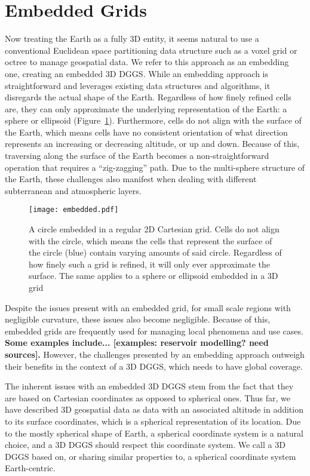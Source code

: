 \section{Embedded Grids} \label{chap:3:embedded}
Now treating the Earth as a fully 3D entity, it seems natural to use a conventional Euclidean space partitioning data structure such as a voxel grid or octree to manage geospatial data.
We refer to this approach as an embedding one, creating an embedded 3D DGGS.
While an embedding approach is straightforward and leverages existing data structures and algorithms, it disregards the actual shape of the Earth.
Regardless of how finely refined cells are, they can only approximate the underlying representation of the Earth: a sphere or ellipsoid (Figure~\ref{fig:embedded}).
Furthermore, cells do not align with the surface of the Earth, which means cells have no consistent orientation of what direction represents an increasing or decreasing altitude, or up and down.
Because of this, traversing along the surface of the Earth becomes a non-straightforward operation that requires a ``zig-zagging'' path.
Due to the multi-sphere structure of the Earth, these challenges also manifest when dealing with different subterranean and atmospheric layers.


\begin{figure}[h]
	\centering
	\texttt{[image: embedded.pdf]}
	\caption[A Circle Embedded in a Regular Cartesian Grid]{
		A circle embedded in a regular 2D Cartesian grid.
		Cells do not align with the circle, which means the cells that represent the surface of the circle (blue) contain varying amounts of said circle.
		Regardless of how finely such a grid is refined, it will only ever approximate the surface.
		The same applies to a sphere or ellipsoid embedded in a 3D grid
	}
	\label{fig:embedded}
\end{figure}


Despite the issues present with an embedded grid, for small scale regions with negligible curvature, these issues also become negligible.
Because of this, embedded grids are frequently used for managing local phenomena and use cases.
\textbf{Some examples include... [examples: reservoir modelling? need sources].}
However, the challenges presented by an embedding approach outweigh their benefits in the context of a 3D DGGS, which needs to have global coverage.


The inherent issues with an embedded 3D DGGS stem from the fact that they are based on Cartesian coordinates as opposed to spherical ones.
Thus far, we have described 3D geospatial data as data with an associated altitude in addition to its surface coordinates, which is a spherical representation of its location.
Due to the mostly spherical shape of Earth, a spherical coordinate system is a natural choice, and a 3D DGGS should respect this coordinate system.
We call a 3D DGGS based on, or sharing similar properties to, a spherical coordinate system Earth-centric.


